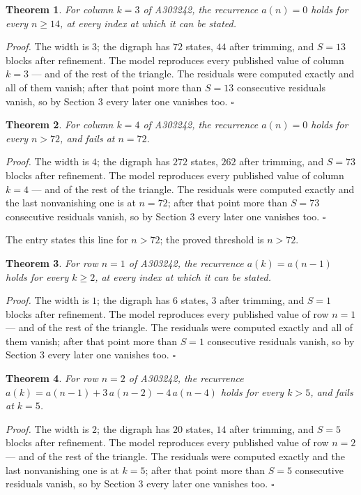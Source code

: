 \documentclass[11pt]{article}
\newtheorem{theorem}{Theorem}
\theoremstyle{definition}
\begin{document}
\begin{theorem} For column $k = 3$ of A303242, the recurrence $a(n) = 0$ holds for every $n \ge 14$, at every index at which it can be stated.\end{theorem}

{\itshape Proof.} The width is $3$; the digraph has $72$ states, $44$ after trimming, and $S = 13$ blocks after refinement. The model reproduces every published value of column $k = 3$ --- and of the rest of the triangle. The residuals were computed exactly and all of them vanish; after that point more than $S = 13$ consecutive residuals vanish, so by Section 3 every later one vanishes too. $\square$

\begin{theorem} For column $k = 4$ of A303242, the recurrence $a(n) = 0$ holds for every $n > 72$, and fails at $n = 72$.\end{theorem}

{\itshape Proof.} The width is $4$; the digraph has $272$ states, $262$ after trimming, and $S = 73$ blocks after refinement. The model reproduces every published value of column $k = 4$ --- and of the rest of the triangle. The residuals were computed exactly and the last nonvanishing one is at $n = 72$; after that point more than $S = 73$ consecutive residuals vanish, so by Section 3 every later one vanishes too. $\square$

The entry states this line for $n > 72$; the proved threshold is $n > 72$.

\begin{theorem} For row $n = 1$ of A303242, the recurrence $a(k) = a(n-1)$ holds for every $k \ge 2$, at every index at which it can be stated.\end{theorem}

{\itshape Proof.} The width is $1$; the digraph has $6$ states, $3$ after trimming, and $S = 1$ blocks after refinement. The model reproduces every published value of row $n = 1$ --- and of the rest of the triangle. The residuals were computed exactly and all of them vanish; after that point more than $S = 1$ consecutive residuals vanish, so by Section 3 every later one vanishes too. $\square$

\begin{theorem} For row $n = 2$ of A303242, the recurrence $a(k) = a(n-1) + 3\,a(n-2) - 4\,a(n-4)$ holds for every $k > 5$, and fails at $k = 5$.\end{theorem}

{\itshape Proof.} The width is $2$; the digraph has $20$ states, $14$ after trimming, and $S = 5$ blocks after refinement. The model reproduces every published value of row $n = 2$ --- and of the rest of the triangle. The residuals were computed exactly and the last nonvanishing one is at $k = 5$; after that point more than $S = 5$ consecutive residuals vanish, so by Section 3 every later one vanishes too. $\square$
\end{document}

